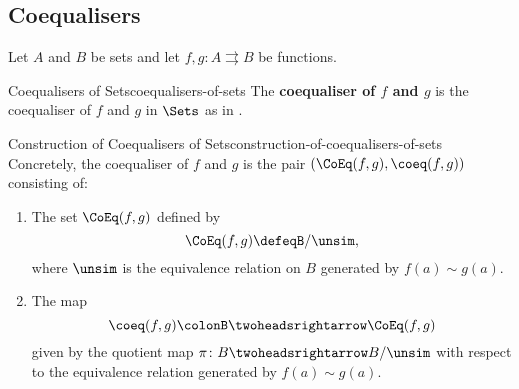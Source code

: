 \subsection{Coequalisers}\label{subsection-coequalisers-of-sets}
Let $A$ and $B$ be sets and let $f,g\colon A\rightrightarrows B$ be functions.
\begin{definition}{Coequalisers of Sets}{coequalisers-of-sets}%
    The \textbf{coequaliser of $f$ and $g$} is the coequaliser of $f$ and $g$ in $\Sets$ as in .
\end{definition}
\begin{construction}{Construction of Coequalisers of Sets}{construction-of-coequalisers-of-sets}%
    Concretely, the coequaliser of $f$ and $g$ is the pair $(\CoEq(f,g),\coeq(f,g))$ consisting of:
    \begin{enumerate}
        \item\label{construction-of-coequalisers-of-sets-the-colimit}The set $\CoEq(f,g)$ defined by%
            \[
                \CoEq(f,g)%
                \defeq%
                B/\unsim,
            \]%
            where $\unsim$ is the equivalence relation on $B$ generated by $f(a)\sim g(a)$.
        \item\label{construction-of-coequalisers-of-sets-the-cocone}The map
            \[
                \coeq(f,g)%
                \colon%
                B%
                \twoheadsrightarrow%
                \CoEq(f,g)%
            \]%
            given by the quotient map $\pi\colon B\twoheadsrightarrow B/\unsim$ with respect to the equivalence relation generated by $f(a)\sim g(a)$.
    \end{enumerate}
\end{construction}
